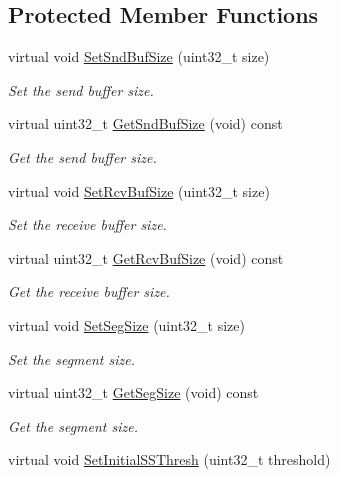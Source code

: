 \subsection*{Protected Member Functions}
\begin{DoxyCompactItemize}
\item 
virtual void \hyperlink{classns3_1_1TcpSocketBase_ad74ab3c8d10069de9f24337009e19a65}{Set\+Snd\+Buf\+Size} (uint32\+\_\+t size)
\begin{DoxyCompactList}\small\item\em Set the send buffer size. \end{DoxyCompactList}\item 
virtual uint32\+\_\+t \hyperlink{classns3_1_1TcpSocketBase_ab2ff28ba55771f51fa607dee6c7d629d}{Get\+Snd\+Buf\+Size} (void) const 
\begin{DoxyCompactList}\small\item\em Get the send buffer size. \end{DoxyCompactList}\item 
virtual void \hyperlink{classns3_1_1TcpSocketBase_a400be1b74a19f5e381e29cdfe1f9fa28}{Set\+Rcv\+Buf\+Size} (uint32\+\_\+t size)
\begin{DoxyCompactList}\small\item\em Set the receive buffer size. \end{DoxyCompactList}\item 
virtual uint32\+\_\+t \hyperlink{classns3_1_1TcpSocketBase_accd0cb0f4780dc2dc3849b78da7f343b}{Get\+Rcv\+Buf\+Size} (void) const 
\begin{DoxyCompactList}\small\item\em Get the receive buffer size. \end{DoxyCompactList}\item 
virtual void \hyperlink{classns3_1_1TcpSocketBase_a03735ecd86c296e081c1825efd945bd6}{Set\+Seg\+Size} (uint32\+\_\+t size)
\begin{DoxyCompactList}\small\item\em Set the segment size. \end{DoxyCompactList}\item 
virtual uint32\+\_\+t \hyperlink{classns3_1_1TcpSocketBase_acd5e25608675522197d8f7784e2ed03d}{Get\+Seg\+Size} (void) const 
\begin{DoxyCompactList}\small\item\em Get the segment size. \end{DoxyCompactList}\item 
virtual void \hyperlink{classns3_1_1TcpSocketBase_adf3850adfe73a0bf0e40f6b81ec30e41}{Set\+Initial\+S\+S\+Thresh} (uint32\+\_\+t threshold)

\end{DoxyCompactItemize}
